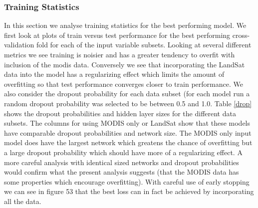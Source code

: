 \documentclass{article} %
\begin{document}
\subsubsection{Training Statistics}
In this section we analyse training statistics for the best performing model. We first look at plots of train versus test performance for the best performing cross-validation fold for each of the input variable subsets. Looking at several different metrics we see training is noisier and has a greater tendency to overfit with inclusion of the modis data. Conversely we see that incorporating the LandSat data into the model has a regularizing effect which limits the amount of overfitting so that test performance converges closer to train performance. We also consider the dropout probability for each data subset (for each model run a random dropout probability was selected to be between 0.5 and 1.0. Table \ref{drop} shows the dropout probabilities and hidden layer sizes for the different data subsets. The columns for using MODIS only or LandSat show that these models have comparable dropout probabilities and network size. The MODIS only input model does have the largest network which greatens the chance of overfitting but a large dropout probability which should have more of a regularizing effect. A more careful analysis with identical sized networks and dropout probabilities would confirm what the present analysis suggests (that the MODIS data has some properties which encourage overfitting). With careful use of early stopping we can see in figure 53 that the best loss  can in fact be achieved by incorporating all the data. 
\end{document}
